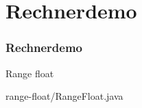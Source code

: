 \def\stitle{Rechnerdemo}
\section{\stitle}
\begin{frame}[fragile]%
  \frametitle{\stitle}%
\medskip

Range float

{range-float/RangeFloat.java}
\end{frame}
